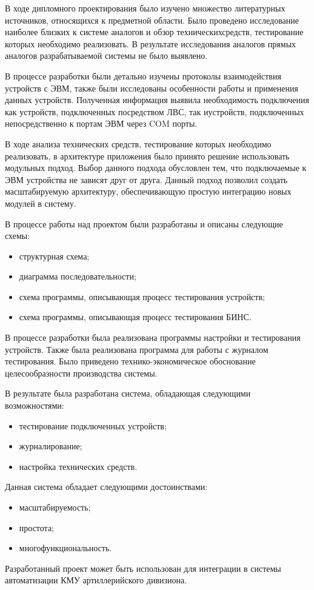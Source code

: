 
В ходе дипломного проектирования было изучено множество литературных источников, относящихся к предметной области. Было
проведено исследование наиболее близких к системе аналогов и обзор технических\break средств, тестирование которых необходимо
реализовать. В результате исследования аналогов прямых аналогов разрабатываемой системы не было выявлено.

В процессе разработки были детально изучены протоколы взаимодействия устройств с ЭВМ, также были исследованы особенности
работы и применения данных устройств. Полученная информация выявила необходимость подключения как устройств,
подключенных посредством ЛВС, так и\break устройств, подключенных непосредственно к портам ЭВМ через COM порты.

В ходе анализа технических средств, тестирование которых необходимо реализовать, в архитектуре приложения было
принято решение использовать модульных подход. Выбор данного подхода обусловлен тем, что подключаемые к ЭВМ
устройства не зависят друг от друга. Данный подход позволил создать масштабируемую архитектуру, обеспечивающую простую
интеграцию новых модулей в систему.

В процессе работы над проектом были разработаны и описаны следующие схемы:
\begin{itemize}
	\item структурная схема;
	\item диаграмма последовательности;
	\item схема программы, описывающая процесс тестирования устройств;
	\item схема программы, описывающая процесс тестирования БИНС.
\end{itemize}

В процессе разработки была реализована программы настройки и тестирования устройств.
Также была реализована программа для работы с журналом тестирования. Было приведено технико-экономическое обоснование
целесообразности производства системы.

В результате была разработана система, обладающая следующими возможностями:
\begin{itemize}
	\item тестирование подключенных устройств;
	\item журналирование;
	\item настройка технических средств.
\end{itemize}

Данная система обладает следующими достоинствами:
\begin{itemize}
	\item масштабируемость;
	\item простота;
	\item многофункциональность.
\end{itemize}

Разработанный проект может быть использован для интеграции в системы автоматизации КМУ артиллерийского дивизиона.
